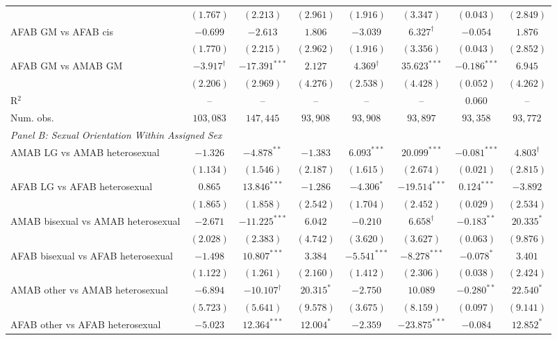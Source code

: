 \begin{table}[htpb!]
{\begin{tabular}{l c c c c c c c}
 & $(1.767)$ & $(2.213)$ & $(2.961)$ & $(1.916)$ & $(3.347)$ & $(0.043)$ & $(2.849)$ \\
AFAB GM vs AFAB cis & $-0.699$ & $-2.613$ & $1.806$ & $-3.039$ & $6.327^{\dagger}$ & $-0.054$ & $1.876$ \\
 & $(1.770)$ & $(2.215)$ & $(2.962)$ & $(1.916)$ & $(3.356)$ & $(0.043)$ & $(2.852)$ \\
AFAB GM vs AMAB GM & $-3.917^{\dagger}$ & $-17.391^{***}$ & $2.127$ & $4.369^{\dagger}$ & $35.623^{***}$ & $-0.186^{***}$ & $6.945$ \\
 & $(2.206)$ & $(2.969)$ & $(4.276)$ & $(2.538)$ & $(4.428)$ & $(0.052)$ & $(4.262)$ \\
\hline
R$^2$ & -- & -- & -- & -- & -- & $0.060$ & -- \\
Num. obs. & $103,083$ & $147,445$ & $93,908$ & $93,908$ & $93,897$ & $93,358$ & $93,772$ \\
\hline
\multicolumn{8}{l}{\textit{Panel B: Sexual Orientation Within Assigned Sex}} \\
AMAB LG vs AMAB heterosexual & $-1.326$ & $-4.878^{**}$ & $-1.383$ & $6.093^{***}$ & $20.099^{***}$ & $-0.081^{***}$ & $4.803^{\dagger}$ \\
 & $(1.134)$ & $(1.546)$ & $(2.187)$ & $(1.615)$ & $(2.674)$ & $(0.021)$ & $(2.815)$ \\
AFAB LG vs AFAB heterosexual & $0.865$ & $13.846^{***}$ & $-1.286$ & $-4.306^{*}$ & $-19.514^{***}$ & $0.124^{***}$ & $-3.892$ \\
 & $(1.865)$ & $(1.858)$ & $(2.542)$ & $(1.704)$ & $(2.452)$ & $(0.029)$ & $(2.534)$ \\
AMAB bisexual vs AMAB heterosexual & $-2.671$ & $-11.225^{***}$ & $6.042$ & $-0.210$ & $6.658^{\dagger}$ & $-0.183^{**}$ & $20.335^{*}$ \\
 & $(2.028)$ & $(2.383)$ & $(4.742)$ & $(3.620)$ & $(3.627)$ & $(0.063)$ & $(9.876)$ \\
AFAB bisexual vs AFAB heterosexual & $-1.498$ & $10.807^{***}$ & $3.384$ & $-5.541^{***}$ & $-8.278^{***}$ & $-0.078^{*}$ & $3.401$ \\
 & $(1.122)$ & $(1.261)$ & $(2.160)$ & $(1.412)$ & $(2.306)$ & $(0.038)$ & $(2.424)$ \\
AMAB other vs AMAB heterosexual & $-6.894$ & $-10.107^{\dagger}$ & $20.315^{*}$ & $-2.750$ & $10.089$ & $-0.280^{**}$ & $22.540^{*}$ \\
 & $(5.723)$ & $(5.641)$ & $(9.578)$ & $(3.675)$ & $(8.159)$ & $(0.097)$ & $(9.141)$ \\
AFAB other vs AFAB heterosexual & $-5.023$ & $12.364^{***}$ & $12.004^{*}$ & $-2.359$ & $-23.875^{***}$ & $-0.084$ & $12.852^{*}$ \\

\end{tabular}}
\end{table}
